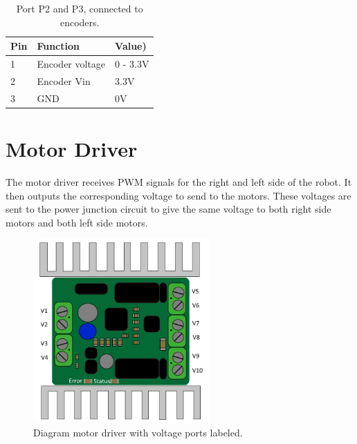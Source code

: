 \documentclass[letterpaper,12pt]{report}
\begin{document}
\begin{table}[h]
	\centering
	\begin{tabular}{| l | l | l |}
 		\hline
 		Pin & Function & Value) \\ \hline 
 		1 & Encoder voltage & 0 - 3.3V \\ \hline
 		2 & Encoder Vin & 3.3V \\ \hline
 		3 & GND & 0V \\ \hline
	\end{tabular}
	\caption{Port P2 and P3, connected to encoders.}
\end{table}


\section{Motor Driver}
The motor driver receives PWM signals for the right and left side of the robot. It then outputs the corresponding voltage to send to the motors. These voltages are sent to the power junction circuit to give the same voltage to both right side motors and both left side motors.
\begin{figure}[h]
	\centering
	\includegraphics[width=0.6\textwidth]{motordriver2.jpg}
	\caption{Diagram motor driver with voltage ports labeled.}
	\label{Figure 1:}
\end{figure}
\end{document}
